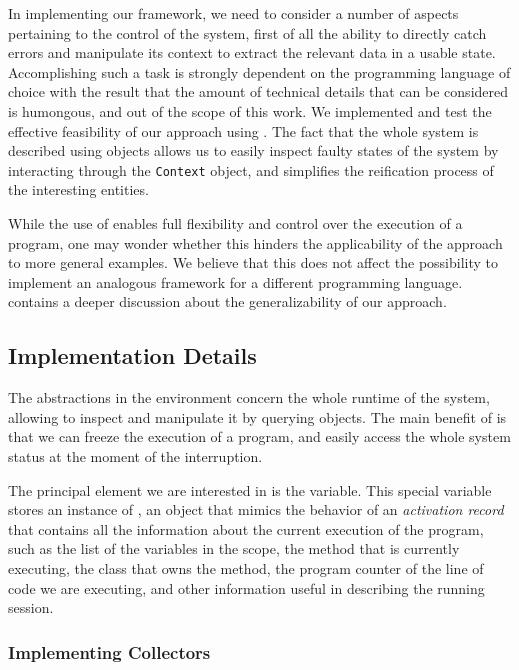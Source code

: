 In implementing our framework, we need to consider a number of aspects pertaining to the control of the system, first of all the ability to directly catch errors and manipulate its context to extract the relevant data in a usable state.
Accomplishing such a task is strongly dependent on the programming language of choice with the result that the amount of technical details that can be considered is humongous, and out of the scope of this work.
We implemented and test the effective feasibility of our approach using \pha.
The fact that the whole system is described using objects allows us to easily inspect faulty states of the system by interacting through the \texttt{Context} object, and simplifies the reification process of the interesting entities.

While the use of \pha enables full flexibility and control over the execution of a program, one may wonder whether this hinders the applicability of the approach to more general examples.
We believe that this does not affect the possibility to implement an analogous framework for a different programming language.
 contains a deeper discussion about the generalizability of our approach.

\subsection{Implementation Details}

The abstractions in the \pha environment concern the whole runtime of the system, allowing to inspect and manipulate it by querying objects.
The main benefit of \pha is that we can freeze the execution of a program, and easily access the whole system status at the moment of the interruption.

The principal element we are interested in is the  variable.
This special variable stores an instance of , an object that mimics the behavior of an \textit{activation record} that contains all the information about the current execution of the program, such as the list of the variables in the scope, the method that is currently executing, the class that owns the method, the program counter of the line of code we are executing, and other information useful in describing the running session.


\subsubsection{Implementing Collectors}

